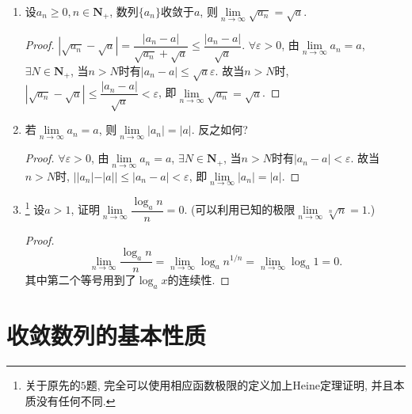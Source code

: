 \documentclass[a4paper,11pt,twoside]{ctexbook}
\begin{document}
\begin{enumerate}
	\item 设$a_n\geqslant 0, n\in\mathbf{N}_{+}$, 数列$\{a_n\}$收敛于$a$, 则$\lim\limits_{n\to\infty}\sqrt{a_n}=\sqrt{a}$.
	      \begin{proof}
		      $|\sqrt{a_n}-\sqrt{a}|=\dfrac{|a_n-a|}{\sqrt{a_n}+\sqrt{a}}\leqslant\dfrac{|a_n-a|}{\sqrt{a}}$. $\forall\varepsilon>0$, 由$\lim\limits_{n\to\infty} a_n=a$, $\exists N\in\mathbf{N}_{+}$, 当$n>N$时有$|a_n-a|\leqslant\sqrt{a}\varepsilon$. 故当$n>N$时, $|\sqrt{a_n}-\sqrt{a}|\leqslant\dfrac{|a_n-a|}{\sqrt{a}}<\varepsilon$, 即$\lim\limits_{n\to\infty}\sqrt{a_n}=\sqrt{a}$.\qedhere
	      \end{proof}
	\item 若$\lim\limits_{n\to\infty} a_n=a$, 则$\lim\limits_{n\to\infty}|a_n|=|a|$. 反之如何?
	      \begin{proof}
		      $\forall\varepsilon>0$, 由$\lim\limits_{n\to\infty} a_n=a$, $\exists N\in\mathbf{N}_{+}$, 当$n>N$时有$|a_n-a|<\varepsilon$. 故当$n>N$时, $||a_n|-|a||\leqslant|a_n-a|<\varepsilon$, 即$\lim\limits_{n\to\infty}|a_n|=|a|$.\qedhere
	      \end{proof}
	\item \footnote{关于原先的$5$题, 完全可以使用相应函数极限的定义加上Heine定理证明, 并且本质没有任何不同.} 设$a>1$, 证明$\lim\limits_{n\to\infty}\dfrac{\log_a{n}}{n}=0$. (可以利用已知的极限$\lim\limits_{n\to\infty}\sqrt[n]{n}=1$.)
	      \begin{proof}
		      \[
			      \lim\limits_{n\to\infty}\dfrac{\log_a{n}}{n}=\lim\limits_{n\to\infty}\log_a{n^{1/n}}=\lim\limits_{n\to\infty}\log_a{1}=0.
		      \]
		      其中第二个等号用到了$\log_a{x}$的连续性.\qedhere
	      \end{proof}
\end{enumerate}

\section{收敛数列的基本性质}
\end{document}
